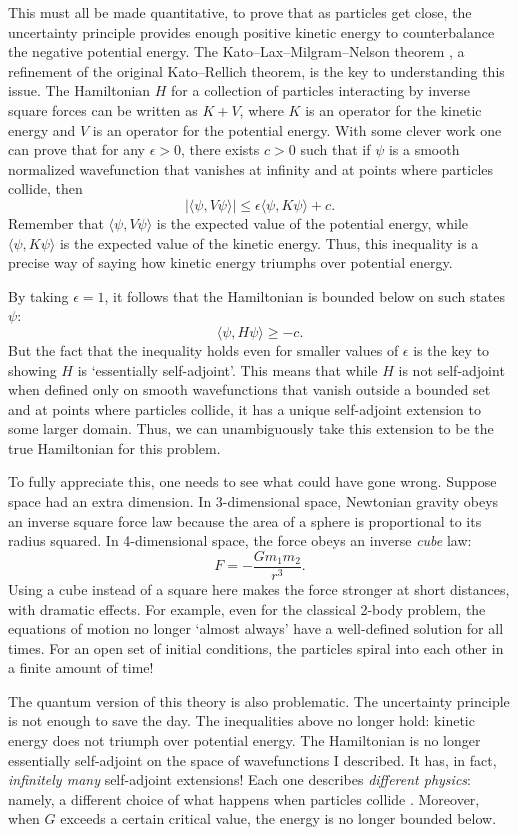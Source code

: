 \documentclass{article}
\begin{document}
This must all be made quantitative, to prove that as particles get close, the uncertainty principle provides enough positive kinetic energy to counterbalance the negative potential energy.  The Kato--Lax--Milgram--Nelson theorem \cite{ReedSimon}, a refinement of the original Kato--Rellich theorem, is the key to understanding this issue.  The Hamiltonian $H$ for a collection of particles interacting by inverse square forces can be written as $K + V$, where $K$ is an operator for the kinetic energy and $V$ is an operator for the potential energy.   With some clever work one can prove that for any $\epsilon > 0$, there exists $c > 0$ such that if $\psi$ is a smooth normalized wavefunction that vanishes at infinity and at points where particles collide, then
\[     | \langle \psi , V  \psi \rangle | \le \epsilon \langle \psi, K\psi \rangle + c. \]
Remember that $\langle \psi , V  \psi \rangle$ is the expected value of the potential energy, while $\langle \psi, K \psi \rangle$ is the expected value of the kinetic energy.  Thus, this inequality is a precise way of saying how kinetic energy triumphs over potential energy.

By taking $\epsilon = 1$, it follows that the Hamiltonian is bounded below on such 
states $\psi$:
\[     \langle \psi , H \psi \rangle \ge -c . \]
But the fact that the inequality holds even for smaller values of $\epsilon$ is the key to showing $H$ is `essentially self-adjoint'.  This means that while $H$ is not self-adjoint when defined only on smooth wavefunctions that vanish outside a bounded set and at points where particles collide, it has a unique self-adjoint extension to some larger domain.  Thus, we can unambiguously take this extension to be the true Hamiltonian for this problem.

To fully appreciate this, one needs to see what could have gone wrong.  Suppose space had an extra dimension.  In 3-dimensional space, Newtonian gravity obeys an inverse square force law because the area of a sphere is proportional to its radius squared.  In 4-dimensional space, the force obeys an inverse \emph{cube} law:
\[  F = -\frac{Gm_1 m_2}{r^3}  . \]
Using a cube instead of a square here makes the force stronger at short distances, with dramatic effects.  For example, even for the classical 2-body problem, the equations of motion no longer `almost always' have a well-defined solution for all times.  For an open set of initial conditions, the particles spiral into each other in a finite amount of time!   

The quantum version of this theory is also problematic.  The uncertainty principle is not enough to save the day.  The inequalities above no longer hold: kinetic energy does not triumph over potential energy.   The Hamiltonian is no longer essentially self-adjoint on the space of wavefunctions I described.  It has, in fact, \emph{infinitely many} self-adjoint extensions!  Each one describes \emph{different physics}: namely, a different choice of what happens when particles collide \cite{GTV,Gopalkrishnan}.  Moreover, when $G$ exceeds a certain critical value, the energy is no longer bounded below.  
\end{document}
